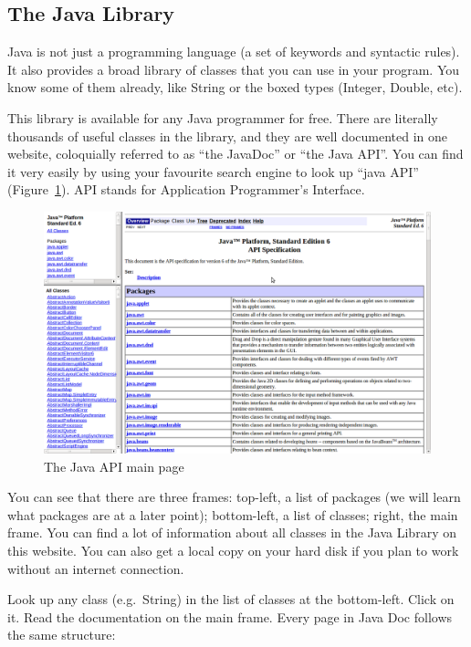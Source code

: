 \subsection{The Java Library}
\label{sec:java-api}

Java is not just a programming language (a set of keywords and
syntactic rules). It also provides a broad library of classes that
you can use in your program. You know some of them already, like
String or the boxed types (Integer, Double, etc). 

This library is available for any Java programmer for free. There are
literally thousands of useful classes in the library, and they are
well documented in one website, coloquially referred to as ``the
JavaDoc'' or ``the Java API''. You can find it very easily by using
your favourite search
engine to look up ``java API'' (Figure~\ref{fig:ajavadoc}). API stands
for Application Programmer's Interface. 

\begin{figure}[tbhp]
  \centering
  \includegraphics[width=\textwidth]{gfx/javadoc}
  \caption{The Java API main page}
  \label{fig:ajavadoc}
\end{figure}

You can see that there are three frames: top-left, a list of packages
(we will learn what packages are at a later point); bottom-left, a
list of classes; right, the main frame. You can find a lot of
information about all classes in the Java Library on this website. You
can also get a local copy on your hard disk if you plan to work
without an internet connection. 

Look up any class (e.g.~String) in the list of classes at the
bottom-left. Click on it. Read the documentation on the main
frame. Every page in Java Doc follows the same structure: 


